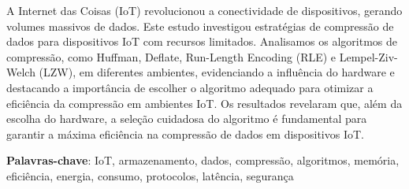 \documentclass{TCC_UP}
\begin{document}


\begin{resumo}
A Internet das Coisas (IoT) revolucionou a conectividade de dispositivos, gerando volumes massivos de dados. Este estudo investigou estratégias de compressão de dados para dispositivos IoT com recursos limitados. Analisamos os algoritmos de compressão, como Huffman, Deflate, Run-Length Encoding (RLE) e Lempel-Ziv-Welch (LZW), em diferentes ambientes, evidenciando a influência do hardware e destacando a importância de escolher o algoritmo adequado para otimizar a eficiência da compressão em ambientes IoT. Os resultados revelaram que, além da escolha do hardware, a seleção cuidadosa do algoritmo é fundamental para garantir a máxima eficiência na compressão de dados em dispositivos IoT.

\textbf{Palavras-chave}: IoT, armazenamento, dados, compressão, algoritmos, memória, eficiência, energia, consumo, protocolos, latência, segurança
\end{resumo}

\end{document}
